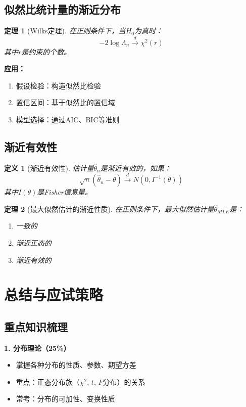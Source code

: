 \documentclass[12pt,a4paper]{article}
\newtheorem{theorem}{定理}[section]
\newtheorem{definition}{定义}[section]
\theoremstyle{remark}
\begin{document}
\subsection{似然比统计量的渐近分布}

\begin{theorem}[Wilks定理]
在正则条件下，当$H_0$为真时：
$$-2\log\Lambda_n \stackrel{d}{\to} \chi^2(r)$$
其中$r$是约束的个数。
\end{theorem}

\textbf{应用：}
\begin{enumerate}
\item 假设检验：构造似然比检验
\item 置信区间：基于似然比的置信域
\item 模型选择：通过AIC、BIC等准则
\end{enumerate}

\subsection{渐近有效性}

\begin{definition}[渐近有效性]
估计量$\hat{\theta}_n$是渐近有效的，如果：
$$\sqrt{n}(\hat{\theta}_n - \theta) \stackrel{d}{\to} N(0, I^{-1}(\theta))$$
其中$I(\theta)$是Fisher信息量。
\end{definition}

\begin{theorem}[最大似然估计的渐近性质]
在正则条件下，最大似然估计量$\hat{\theta}_{MLE}$是：
\begin{enumerate}
\item 一致的
\item 渐近正态的
\item 渐近有效的
\end{enumerate}
\end{theorem}

\section{总结与应试策略}

\subsection{重点知识梳理}

\textbf{1. 分布理论（25\%）}
\begin{itemize}
\item 掌握各种分布的性质、参数、期望方差
\item 重点：正态分布族（$\chi^2$, $t$, $F$分布）的关系
\item 常考：分布的可加性、变换性质
\end{itemize}
\end{document}

